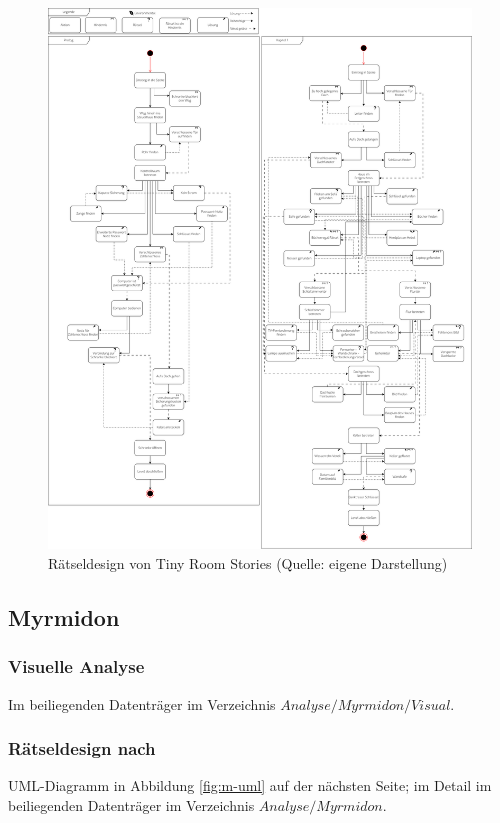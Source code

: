 \documentclass[
	12pt,
	a4paper,
	bibtotoc,
	cleardoubleempty, 
	idxtotoc,
	ngerman,
	openright
	final,
	listof=nochaptergap,
	]{scrbook}
\begin{document}
\begin{appendices}
\newpage

\begin{figure}[ht]
\centering
\includegraphics[width=1\linewidth]{content/pictures/TinyRoomStoriesUML.png}
\caption{Rätseldesign von Tiny Room Stories (Quelle: eigene Darstellung)}
\label{fig:trs-uml}
\end{figure}

\clearpage

\subsection{Myrmidon}\label{sec:append_anylsis_m}

\subsubsection{Visuelle Analyse}\label{sec:append_anylsis_m_visual}
Im beiliegenden Datenträger im Verzeichnis $Analyse/Myrmidon/Visual$.

\subsubsection{Rätseldesign nach \cite{schafer_grim_1996}}\label{sec:append_riddles_m}
UML-Diagramm in Abbildung \ref{fig:m-uml} auf der nächsten Seite; im Detail im beiliegenden Datenträger im Verzeichnis $Analyse/Myrmidon$.


\end{appendices}
\end{document}
